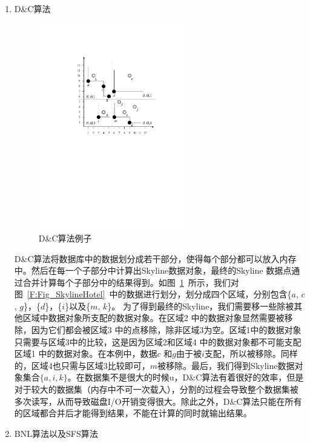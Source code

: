 \begin{enumerate}
  \item D$\&$C算法

  \begin{figure}[thb]
    \centering
    \includegraphics[width=0.6\textwidth]{./FIGs/Fig_SkyAlgoDC.pdf}
    \caption{D$\&$C算法例子}
    \label{F:Fig_SkyAlgoDC}
  \end{figure}

  D$\&$C算法将数据库中的数据划分成若干部分，使得每个部分都可以放入内存中。然后在每一个子部分中计算出Skyline数据对象，最终的Skyline 数据点通过合并计算每个子部分中的结果得到。如图~\ref{F:Fig_SkyAlgoDC}~所示，我们对图~\ref{F:Fig_SkylineHotel}~中的数据进行划分，划分成四个区域，分别包含\{$a$, $c$, $g$\}，\{$d$\}，\{$i$\}以及\{$m$, $k$\}。 为了得到最终的Skyline，我们需要移一些除被其他区域中数据对象所支配的数据对象。在区域2 中的数据对象显然需要被移除，因为它们都会被区域3 中的点移除，除非区域3为空。区域1中的数据对象只需要与区域3中的比较，这是因为区域2和区域4 中的数据对象都不可能支配区域1 中的数据对象。在本例中，数据$c$ 和$g$由于被$i$支配，所以被移除。同样的，区域4也只需与区域3比较即可，$m$被移除。最后，我们得到Skyline数据对象集合$\{a, i, k\}$。在数据集不是很大的时候u，D$\&$C算法有着很好的效率，但是对于较大的数据集（内存中不可一次载入），分割的过程会导致整个数据集被多次读写，从而导致磁盘I/O开销变得很大。除此之外，D$\&$C算法只能在所有的区域都合并后才能得到结果，不能在计算的同时就输出结果。

  \item BNL算法以及SFS算法


\end{enumerate}
